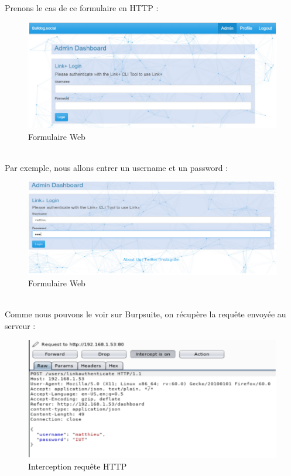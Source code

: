\newpage
\noindent Prenons le cas de ce formulaire en HTTP :
\begin{figure}[htp!]
  \centering
  \setlength\figureheight{7cm}
  \setlength\figurewidth{9cm}
  \includegraphics[width=1\textwidth]{oui/Ancien/imangeancien/burpsuite/burpsuite4.PNG}
  \caption{Formulaire Web}
  \label{fig:courbe-tikz}
\end{figure}\\
\noindent Par exemple, nous allons entrer un username et un password :
\begin{figure}[htp!]
  \centering
  \setlength\figureheight{7cm}
  \setlength\figurewidth{9cm}
  \includegraphics[width=1\textwidth]{oui/Ancien/imangeancien/burpsuite/burpsuite5.PNG}
  \caption{Formulaire Web}
  \label{fig:courbe-tikz}
\end{figure}\\
Comme nous pouvons le voir sur Burpsuite, on récupère la requête envoyée au serveur :
\newpage
\begin{figure}[htp!]
  \centering
  \setlength\figureheight{7cm}
  \setlength\figurewidth{9cm}
  \includegraphics[width=1\textwidth]{oui/Ancien/imangeancien/burpsuite/burpsuite6.PNG}
  \caption{Interception requête HTTP}
  \label{fig:courbe-tikz}
\end{figure}

